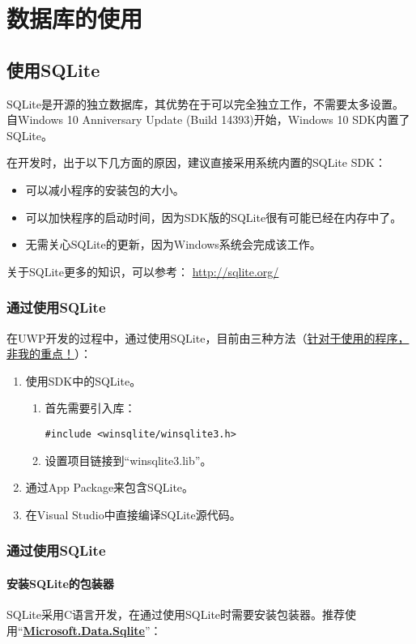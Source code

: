 \chapter{数据库的使用}
	
	\section{使用SQLite}
	SQLite是开源的独立数据库，其优势在于可以完全独立工作，不需要太多设置。自Windows 10 Anniversary Update (Build 14393)开始，Windows 10 SDK内置了SQLite。
	
	在开发时，出于以下几方面的原因，建议直接采用系统内置的SQLite SDK：
	\begin{itemize}
		\item 可以减小程序的安装包的大小。
		\item 可以加快程序的启动时间，因为SDK版的SQLite很有可能已经在内存中了。
		\item 无需关心SQLite的更新，因为Windows系统会完成该工作。
	\end{itemize}
	
	关于SQLite更多的知识，可以参考：	\url{http://sqlite.org/}
	\subsection{通过\Cpp 使用SQLite}
	在UWP开发的过程中，通过\Cpp 使用SQLite，目前由三种方法（\href{https://docs.microsoft.com/en-us/windows/uwp/data-access/sqlite-databases}{针对于使用\Cpp 的程序，非我的重点！}）：
	\begin{enumerate}
		\item 使用SDK中的SQLite。
		\begin{enumerate}
		\item 首先需要引入库：
\begin{verbatim}
#include <winsqlite/winsqlite3.h>
\end{verbatim}
\item 设置项目链接到“winsqlite3.lib”。
\end{enumerate}	
\item 通过App Package来包含SQLite。
\item 在Visual Studio中直接编译SQLite源代码。
	\end{enumerate}

\subsection{通过\csharp 使用SQLite}
\subsubsection{安装SQLite的\csharp 包装器}
SQLite采用C语言开发，在通过\csharp 使用SQLite时需要安装\csharp 包装器。推荐使用“\uline{\textbf{Microsoft.Data.Sqlite}}”：

